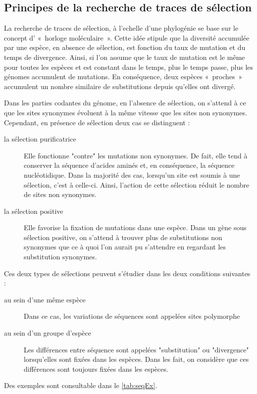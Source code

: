 \documentclass[../main]{subfiles} %
\begin{document}
\subsection{Principes de la recherche de traces de sélection}
\label{PrincipeTrace}
La recherche de traces de sélection, à l'echelle d'une \gls{phylogénie} se base sur le concept d’ « horloge moléculaire ». Cette idée stipule que la diversité accumulée par une espèce, en absence de sélection, est fonction du taux de mutation et du temps de divergence. Ainsi, si l'on assume que le taux de mutation est le même pour toutes les espèces et est constant dans le temps, plus le temps passe, plus les génomes accumulent de mutations. En conséquence, deux espèces « proches » accumulent un nombre similaire de \glspl{substitution} depuis qu'elles ont divergé.

Dans les parties codantes du génome, en l'absence de sélection, on s'attend à ce que les sites \glspl{synonyme} évoluent à la même vitesse que les sites non \glspl{synonyme}. Cependant, en présence de sélection deux cas se distinguent :
\begin{description}

    \item [la sélection purificatrice] Elle fonctionne "contre" les mutations non \glspl{synonyme}. De fait, elle tend à conserver la séquence d'acides aminés et, en conséquence, la séquence nucléotidique. Dans la majorité des cas, lorsqu'un site est soumis à une sélection, c'est à celle-ci. Ainsi, l'action de cette sélection réduit le nombre de sites non \glspl{synonyme}.

    \item [la sélection positive] Elle favorise la fixation de mutations dans une espèce. Dans un gène sous sélection positive, on s'attend à trouver plus de substitutions non \glspl{synonyme} que ce à quoi l'on aurait pu s'attendre en regardant les substitution \glspl{synonyme}.
    
\end{description}

Ces deux types de sélections peuvent s'étudier dans les deux conditions suivantes :
\begin{description}
    \item [au sein d’une même espèce] Dans ce cas, les variations de séquences sont appelées sites polymorphe
    \item [au sein d'un groupe d'espèce] Les différences entre séquence sont appelées "\gls{substitution}" ou "divergence" lorsqu'elles sont fixées dans les espèces. Dans les fait, on  considère que ces différences sont toujours fixées dans les espèces.
\end{description}
Des exemples sont consultable dans le \cref{tab:seqEx}.
\end{document}
